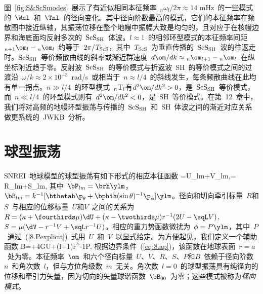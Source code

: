 图~\ref{fig:S&ScSmodes}~展示了有近似相同本征频率~${}_n\omega_l/2\pi\approx 14$ mHz~的一些模式的~$\Wnl$~和~$\Tnl$~的径向变化。其中径向阶数最高的模式，它们的本征频率在频散图中接近纵轴，其振荡位移在整个地幔中振幅大致是均匀的，且对应于在核幔边界和海底面均反射多次的~${\rm ScS}_{\rm SH}$~体波。$l\approx 1$~的相邻环型模式的本征频率间距~${}_{n+1}\om_l-{}_n\om_l$~约等于~$2\pi/\hspace{0.2 mm}T_{\rm ScS}$，其中~$T_{\rm ScS}$~为垂直传播的~${\rm ScS}_{\rm SH}$~波的往返走时。${\rm ScS}_{\rm SH}$~等价频散曲线的斜率或渐近群速度~$d\om/dk\approx{}_n\om_{l+1}
-{}_n\om_l$~在纵坐标附近趋于零。反射波~${\rm ScS}_{\rm SH}$~的等价模式与折返波~SH~的等价模式之间的过渡沿~$\omega/k\approx 2\times 10^{-3}$~rad/s~或相当于~$n\approx l/4$~的斜线发生，每条频散曲线在此均有单一拐点。$n\gg l/4$~的环型模式~${}_n{\rm T}_l$有$d^2\om/dk^2>0$，是~${\rm ScS}_{\rm SH}$~等价模式，而~$n\ll l/4$~的环型模式则有~$d^2\om/dk^2<0$，是~SH~等价模式。在第~12~章中，我们将对高频的地幔环型振荡与传播的~${\rm ScS}_{\rm SH}$~和~SH~体波之间的渐近对应关系做更系统的~JWKB~分析。
%
%

\section{球型振荡}
%
%
\label{section:8.spheroidaloscillations}

SNREI~地球模型的球型振荡有如下形式的相应本征函数
%
\eq \label{eq:8.spherdis}
\bs=U\bP_{lm}+V\bB_{lm},\qquad\brh\cdot\bT=
R\bP_{lm}+S\bB_{lm},
\en
其中~$\bP_{lm}=\brh\ylm$，$\bB_{lm}=k^{-1}[\bthetah\p_{\theta}
+\bphih(\sin\theta)^{-1}\p_{\phi}]\ylm$。径向和切向牵引标量~$R$和$S$~与相应的位移标量~$U$和$V$~之间的关系为\vspace{-0.6 mm}
$R=(\kappa+\fourthirds\mu)\dU
+(\kappa-\twothirds\mu)r^{-1}(2U-\sqL V)$,
$S=\mu(\dV-r^{-1}V+\sqL r^{-1}U)$。相应的重力势函数微扰为~$\phi=P\ylm$，其中~$P$~通过~(\ref{8.Pexplicit})~式用~$U$~和~$V$~以显式给定。为方便起见，我们定义一个辅助函数
\eq
B=\dP+4\pi G\rho\hspace{0.2 mm}U+(l+1)r^{-1}P,
\label{eq:8.K}
\en
根据边界条件~(\ref{eq:8.ap})，该函数在地球表面~$r=a$~处为零。本征频率~$\om$~和六个径向标量~$U$、$V$、$R$、$S$、$P$和$B$~依赖于径向阶数~$n$~和角次数~$l$，但与方位角级数~$m$~无关。角次数~$l=0$~的球型振荡具有纯径向的位移和牵引力矢量，因为切向的矢量球谐函数~$\bB_{00}$~为零；这些模式被称为{\em 径向模式\/}。
%
%


